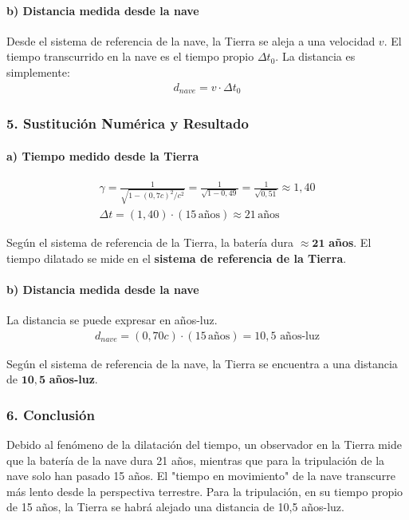 \paragraph{b) Distancia medida desde la nave}
Desde el sistema de referencia de la nave, la Tierra se aleja a una velocidad $v$. El tiempo transcurrido en la nave es el tiempo propio $\Delta t_0$. La distancia es simplemente:
\begin{gather}
    d_{nave} = v \cdot \Delta t_0
\end{gather}

\subsubsection*{5. Sustitución Numérica y Resultado}
\paragraph{a) Tiempo medido desde la Tierra}
\begin{gather}
    \gamma = \frac{1}{\sqrt{1 - (0,7c)^2/c^2}} = \frac{1}{\sqrt{1 - 0,49}} = \frac{1}{\sqrt{0,51}} \approx 1,40 \\
    \Delta t = (1,40) \cdot (15 \, \text{años}) \approx 21 \, \text{años}
\end{gather}
\begin{cajaresultado}
    Según el sistema de referencia de la Tierra, la batería dura $\boldsymbol{\approx 21}$ \textbf{años}. El tiempo dilatado se mide en el \textbf{sistema de referencia de la Tierra}.
\end{cajaresultado}

\paragraph{b) Distancia medida desde la nave}
La distancia se puede expresar en años-luz.
\begin{gather}
    d_{nave} = (0,70 c) \cdot (15 \, \text{años}) = 10,5 \text{ años-luz}
\end{gather}
\begin{cajaresultado}
    Según el sistema de referencia de la nave, la Tierra se encuentra a una distancia de $\boldsymbol{10,5}$ \textbf{años-luz}.
\end{cajaresultado}

\subsubsection*{6. Conclusión}
\begin{cajaconclusion}
Debido al fenómeno de la dilatación del tiempo, un observador en la Tierra mide que la batería de la nave dura 21 años, mientras que para la tripulación de la nave solo han pasado 15 años. El "tiempo en movimiento" de la nave transcurre más lento desde la perspectiva terrestre. Para la tripulación, en su tiempo propio de 15 años, la Tierra se habrá alejado una distancia de 10,5 años-luz.
\end{cajaconclusion}

